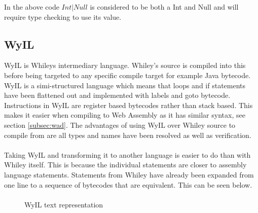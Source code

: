 
In the above code $Int | Null$ is considered to be both a Int and Null and will require type checking to use its value.

\subsection{WyIL}

WyIL is Whileys intermediary language. Whiley's source is compiled into this before being targeted to any specific compile target for example Java bytecode. WyIL is a simi-structured language \cite{1_pearce_2016} which means that loops and if statements have been flattened out and implemented with labels and goto bytecode. Instructions in WyIL are register based bytecodes \cite{1_pearce_2016} rather than stack based. This makes it easier when compiling to Web Assembly as it has similar syntax, see section \ref{subsec:wad}. The advantages of using WyIL over Whiley source to compile from are all types and names have been resolved \cite{1_pearce_2016} as well as verification.

\paragraph{}
Taking WyIL and transforming it to another language is easier to do than with Whiley itself. This is because the individual statements are closer to assembly language statements. Statements from Whiley have already been expanded from one line to a sequence of bytecodes that are equivalent. This can be seen below.  

\paragraph{}

\begin{figure}[H]
  \centering
  
  \caption{WyIL text representation}
  \label{fig:wyil}
\end{figure}

